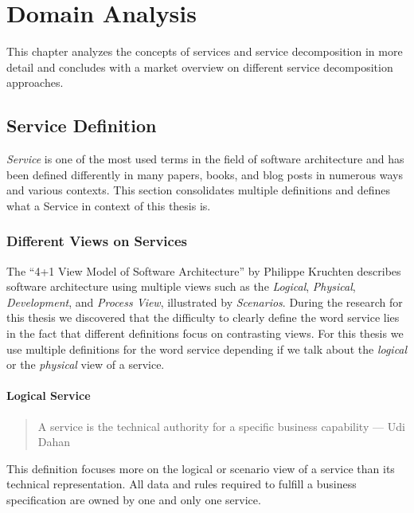 \chapter{Domain Analysis}
\label{cha:analysis}

This chapter analyzes the concepts of services and service decomposition in more detail and concludes with a market overview on different service decomposition approaches. 

\section{Service Definition}
\label{sec:serviceIntro}

\textit{Service} is one of the most used terms in the field of software architecture and has been defined differently in many papers, books, and blog posts in numerous ways and various contexts. This section consolidates multiple definitions and defines what a Service in context of this thesis is.

\subsection{Different Views on Services}

The \enquote{4+1 View Model of Software Architecture} by Philippe Kruchten\cite{fourPlusOne} describes software architecture using multiple views such as the \textit{Logical}, \textit{Physical}, \textit{Development}, and \textit{Process View}, illustrated by \textit{Scenarios}. During the research for this thesis we discovered that the difficulty to clearly define the word service lies in the fact that different definitions focus on contrasting views. For this thesis we use multiple definitions for the word service depending if we talk about the \textit{logical} or the \textit{physical} view of a service.

\subsubsection{Logical Service}

\begin{quotation}
A service is the technical authority for a specific business capability --- Udi Dahan\cite{serviceDefinitionDahan}
\end{quotation}
   
This definition focuses more on the logical or scenario view of a service than its technical representation. All data and rules required to fulfill a business specification are owned by one and only one service. 

